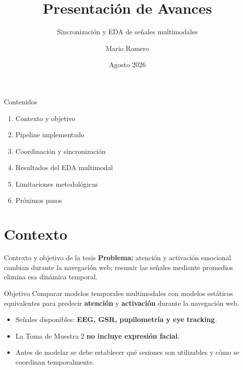 \documentclass[aspectratio=169]{beamer}
\title[Avances Tesis]{Presentación de Avances}
\subtitle{Sincronización y EDA de señales multimodales}
\author[Mario Romero]{Mario Romero}
\institute{Magíster en Data Science}
\date{Agosto 2026}
\begin{document}
\begin{frame}
  \titlepage
\end{frame}

\begin{frame}{Contenidos}
\begin{enumerate}
  \item Contexto y objetivo
  \item Pipeline implementado
  \item Coordinación y sincronización
  \item Resultados del EDA multimodal
  \item Limitaciones metodológicas
  \item Próximos pasos
\end{enumerate}
\end{frame}

\section{Contexto}
\begin{frame}{Contexto y objetivo de la tesis}
\textbf{Problema:} atención y activación emocional cambian durante la navegación web;
resumir las señales mediante promedios elimina esa dinámica temporal.

\medskip
\begin{block}{Objetivo}
Comparar modelos temporales multimodales con modelos estáticos equivalentes para predecir
\textbf{atención} y \textbf{activación} durante la navegación web.
\end{block}

\begin{itemize}
  \item Señales disponibles: \textbf{EEG, GSR, pupilometría y eye tracking}.
  \item La Toma de Muestra 2 \textbf{no incluye expresión facial}.
  \item Antes de modelar se debe establecer qué sesiones son utilizables y cómo se coordinan temporalmente.
\end{itemize}
\end{frame}

\end{document}
